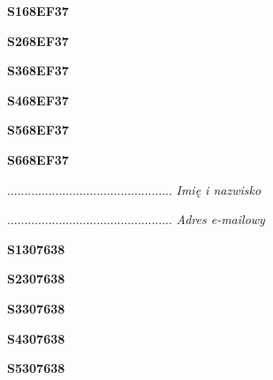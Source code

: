 \begin{turn}{90}\huge \textbf{S168EF37}\end{turn}

\begin{turn}{90}\huge \textbf{S268EF37}\end{turn}

\begin{turn}{90}\huge \textbf{S368EF37}\end{turn}

\begin{turn}{90}\huge \textbf{S468EF37}\end{turn}

\begin{turn}{90}\huge \textbf{S568EF37}\end{turn}

\begin{turn}{90}\huge \textbf{S668EF37}\end{turn}

\begin{turn}{90}\begin{minipage}{\linewidth} \vspace{20mm} ................................................  \textit{Imię i nazwisko}\end{minipage}\end{turn}

\begin{turn}{90}\begin{minipage}{\linewidth} \vspace{20mm} ................................................  \textit{Adres e-mailowy}\end{minipage}\end{turn}

\begin{turn}{90}\huge \textbf{S1307638}\end{turn}

\begin{turn}{90}\huge \textbf{S2307638}\end{turn}

\begin{turn}{90}\huge \textbf{S3307638}\end{turn}

\begin{turn}{90}\huge \textbf{S4307638}\end{turn}

\begin{turn}{90}\huge \textbf{S5307638}\end{turn}

